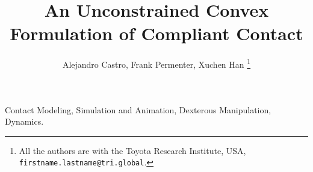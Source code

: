 \documentclass[journal]{./IEEEtran/IEEEtran}
\begin{document}
\title{An Unconstrained Convex Formulation of Compliant Contact}


\author{Alejandro Castro, Frank Permenter, Xuchen Han%
\thanks{All the authors are with the Toyota Research Institute, USA, {\tt\small
firstname.lastname@tri.global}.}%
}


\maketitle

\begin{abstract}

\end{abstract}

\begin{IEEEkeywords}
Contact Modeling, Simulation and Animation, Dexterous Manipulation, Dynamics.
\end{IEEEkeywords}


%
\IEEEpeerreviewmaketitle










\end{document}
